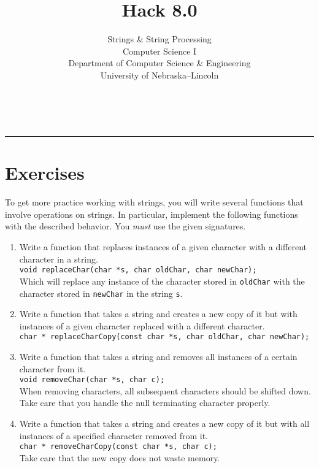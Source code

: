 \documentclass[12pt]{scrartcl}
\title{Hack 8.0}\let\Title\@title
\subtitle{Strings \& String Processing\\
Computer Science I\\
{\small
\vskip1cm
Department of Computer Science \& Engineering \\
University of Nebraska--Lincoln}
\vskip-1cm}
\date{~}
\begin{document}
\maketitle

\hrule



\section*{Exercises}

To get more practice working with strings, you will write several 
functions that involve operations on strings.  In particular, implement
the following functions with the described behavior.  You \emph{must}
use the given signatures.

\begin{enumerate}

  \item Write a function that replaces instances of a given character 
  with a different character in a string.\\
  \texttt{void replaceChar(char *s, char oldChar, char newChar);}\\
  Which will replace any instance of the character stored in 
  \texttt{oldChar} with the character stored in \texttt{newChar} 
  in the string \texttt{s}.  

  \item Write a function that takes a string and creates a new copy of it
  but with instances of a given character replaced with a different character.\\
  \texttt{char * replaceCharCopy(const char *s, char oldChar, char newChar);}\\

  \item Write a function that takes a string and removes all instances 
  of a certain character from it.\\
  \texttt{void removeChar(char *s, char c);}\\
  When removing characters, all subsequent characters should be 
  shifted down.  Take care that you handle the null terminating character 
  properly.

  \item Write a function that takes a string and creates a new copy of
  it but with all instances of a specified character removed from it.\\
  \texttt{char * removeCharCopy(const char *s, char c);}\\
  Take care that the new copy does not waste memory.


\end{enumerate}
\end{document}
